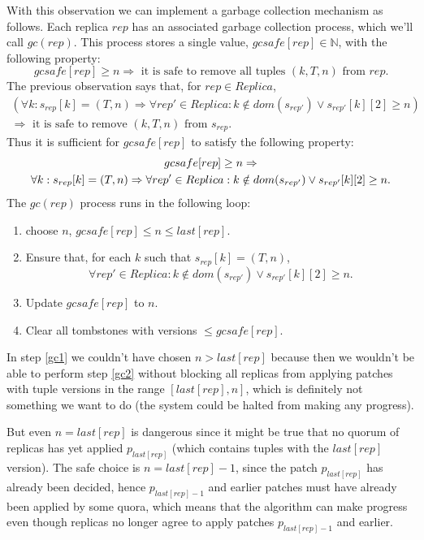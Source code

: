 \documentclass[12pt,a4paper,en]{pracamgr}
\newcommand{\mbb}[1]{\mathbb{#1}}
\begin{document}
With this observation we can implement a garbage collection mechanism as follows. Each replica $rep$ has an associated garbage collection process, which we'll call $gc(rep)$. This process stores a single value, $gcsafe[rep] \in \mbb N$, with the following property:
$$ gcsafe[rep] \ge n \Rightarrow \text{ it is safe to remove all tuples } (k, T, n) \text{ from } rep. $$
The previous observation says that, for $rep \in Replica$,
\begin{multline*}
    (\forall k: s_{rep}[k] = (T, n) \Rightarrow \forall rep' \in Replica: k \notin dom(s_{rep'}) \lor s_{rep'}[k][2] \ge n)\\
        \Rightarrow \text{ it is safe to remove } (k, T, n) \text{ from } s_{rep}.
\end{multline*}
Thus it is sufficient for $gcsafe[rep]$ to satisfy the following property:
\begin{multline*}
    gcsafe[rep] \ge n \Rightarrow\\
        \forall k: s_{rep}[k] = (T, n) \Rightarrow \forall rep' \in Replica: k \notin dom(s_{rep'}) \lor s_{rep'}[k][2] \ge n.$$
\end{multline*}
The $gc(rep)$ process runs in the following loop:
\begin{enumerate}
    \item \label{gc1} choose $n$, $gcsafe[rep] \le n \le last[rep]$.
    \item \label{gc2} Ensure that, for each $k$ such that $s_{rep}[k] = (T, n)$,
        $$ \forall rep' \in Replica: k \notin dom(s_{rep'}) \lor s_{rep'}[k][2] \ge n.$$
    \item Update $gcsafe[rep]$ to $n$.
    \item Clear all tombstones with versions $\le gcsafe[rep]$.
\end{enumerate}
In step \ref{gc1} we couldn't have chosen $n > last[rep]$ because then we wouldn't be able to perform step \ref{gc2} without blocking all replicas from applying patches with tuple versions in the range $[last[rep], n]$, which is definitely not something we want to do (the system could be halted from making any progress).

But even $n = last[rep]$ is dangerous since it might be true that no quorum of replicas has yet applied $p_{last[rep]}$ (which contains tuples with the $last[rep]$ version). The safe choice is $n = last[rep] - 1$, since the patch $p_{last[rep]}$ has already been decided, hence $p_{last[rep]-1}$ and earlier patches must have already been applied by some quora, which means that the algorithm can make progress even though replicas no longer agree to apply patches $p_{last[rep]-1}$ and earlier.
\end{document}
